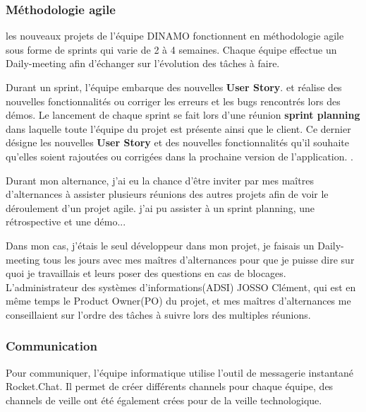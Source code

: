 \documentclass[12pt]{article}
\begin{document}
\subsubsection{Méthodologie agile}

les nouveaux projets de l'équipe DINAMO fonctionnent en méthodologie agile sous forme de sprints qui varie de 2 à 4 semaines. Chaque équipe effectue un Daily-meeting afin d'échanger sur l'évolution des tâches à faire.

Durant un sprint, l'équipe embarque des nouvelles \textbf{User Story}\footnotemark. et réalise des nouvelles fonctionnalités ou corriger les erreurs et les bugs rencontrés lors des démos. Le lancement de chaque sprint se fait lors d'une réunion \textbf{sprint planning} dans laquelle toute l'équipe du projet est présente ainsi que le client. Ce dernier désigne les nouvelles \textbf{User Story} et des nouvelles fonctionnalités qu'il souhaite qu'elles soient rajoutées ou corrigées dans la prochaine version de l'application. 
.

Durant mon alternance, j'ai eu la chance d'être inviter par mes maîtres d'alternances à assister plusieurs réunions des autres projets afin de voir le déroulement d'un projet agile. j'ai pu assister à un sprint planning, une rétrospective et une démo...    

Dans mon cas, j'étais le seul développeur dans mon projet, je faisais un Daily-meeting  tous les jours avec mes maîtres d'alternances pour que je puisse dire sur quoi je travaillais et leurs poser des questions en cas de blocages. L'administrateur des systèmes d'informations(ADSI) JOSSO Clément, qui est en même temps le Product Owner(PO) du projet, et mes maîtres d'alternances me conseillaient sur l'ordre des tâches à suivre lors des multiples réunions.   

\subsubsection{Communication}

Pour communiquer, l'équipe informatique utilise l'outil de messagerie instantané Rocket.Chat. Il permet de créer différents
channels pour chaque équipe, des channels de veille ont été également crées pour de la veille technologique.
\end{document}
